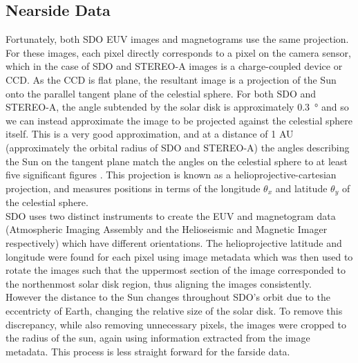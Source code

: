 \documentclass[11pt,a4paper,onecolumn]{report}
\begin{document}
\subsection{Nearside Data}
Fortunately,  both SDO EUV images and magnetograms use the same projection. For
these images, each pixel directly corresponds to a pixel on the camera sensor,
which in the case of SDO and STEREO-A images is a charge-coupled device or
CCD\citep{kaiser_stereo_2008,lemen_atmospheric_2012}. As the CCD is flat plane,
the resultant image is a projection of the Sun onto the parallel tangent plane of the
celestial sphere.
For both SDO and STEREO-A, the angle subtended by the solar disk is
approximately \SI[]{0.3}[]{\degree} and so we can instead approximate the image
to be projected against the celestial sphere itself.  %
This is a very good approximation, and at a distance of 1 AU (approximately the
orbital radius of SDO and STEREO-A) the angles describing the Sun on the tangent
plane match the angles on the celestial sphere to at least five significant
figures \citep{thompson_w_t_coordinate_2006}. This projection is known as a
helioprojective-cartesian projection, and measures positions in terms of the
longitude \(\theta_x\) and latitude \(\theta_y\) of the celestial sphere.\\

SDO uses two distinct instruments to create the EUV and magnetogram data
(Atmospheric Imaging Assembly \citep{lemen_atmospheric_2012} and the
Helioseismic and Magnetic Imager \citep{scherrer_helioseismic_2012}
respectively) which have different orientations. The helioprojective latitude
and longitude were found for each pixel using image metadata which was then used
to rotate the images such that the uppermost section of the image corresponded to
the northenmost solar disk region, thus aligning the images consistently.\\

However the distance to the Sun changes throughout SDO's orbit due to the
eccentricty of Earth, changing the relative size of the solar disk. To remove
this discrepancy, while also removing unnecessary pixels, the images were
cropped to the radius of the sun, again using information extracted from the
image metadata. This process is less straight forward for the farside data.
\end{document}
